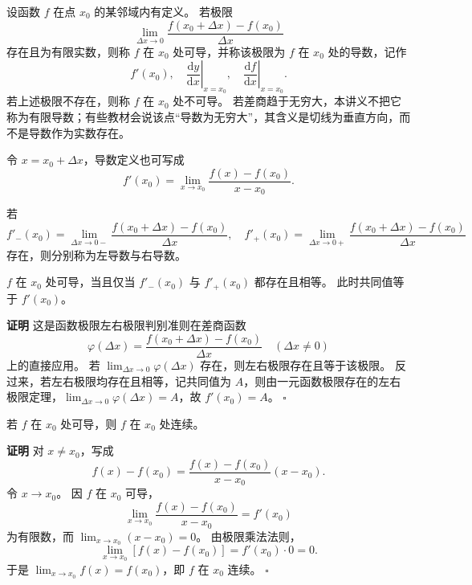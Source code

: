 \documentclass[fontset=fandol]{ctexart}
\newenvironment{proofdetail}{\par\noindent\textbf{证明}\quad}{\hfill$\square$\par\vspace{0.8em}}
\newcommand{\dd}{\mathrm{d}}
\begin{document}
\begin{definition}[导数]
设函数 $f$ 在点 $x_0$ 的某邻域内有定义。 若极限
\[
\lim_{\Delta x\to0}\frac{f(x_0+\Delta x)-f(x_0)}{\Delta x}
\]
存在且为有限实数，则称 $f$ 在 $x_0$ 处可导，并称该极限为 $f$ 在 $x_0$ 处的导数，记作
\[
f'(x_0),\quad \left.\frac{\dd y}{\dd x}\right|_{x=x_0},\quad \left.\frac{\dd f}{\dd x}\right|_{x=x_0}.
\]
若上述极限不存在，则称 $f$ 在 $x_0$ 处不可导。 若差商趋于无穷大，本讲义不把它称为有限导数；有些教材会说该点“导数为无穷大”，其含义是切线为垂直方向，而不是导数作为实数存在。
\end{definition}

令 $x=x_0+\Delta x$，导数定义也可写成
\[
f'(x_0)=\lim_{x\to x_0}\frac{f(x)-f(x_0)}{x-x_0}.
\]

\begin{definition}[左导数与右导数]
若
\[
f'_-(x_0)=\lim_{\Delta x\to0-}\frac{f(x_0+\Delta x)-f(x_0)}{\Delta x},\quad
f'_+(x_0)=\lim_{\Delta x\to0+}\frac{f(x_0+\Delta x)-f(x_0)}{\Delta x}
\]
存在，则分别称为左导数与右导数。
\end{definition}

\begin{proposition}[可导的充要条件]
$f$ 在 $x_0$ 处可导，当且仅当 $f'_-(x_0)$ 与 $f'_+(x_0)$ 都存在且相等。 此时共同值等于 $f'(x_0)$。
\end{proposition}
\begin{proofdetail}
这是函数极限左右极限判别准则在差商函数
\[
\varphi(\Delta x)=\frac{f(x_0+\Delta x)-f(x_0)}{\Delta x}\quad(\Delta x\neq0)
\]
上的直接应用。 若 $\lim_{\Delta x\to0}\varphi(\Delta x)$ 存在，则左右极限存在且等于该极限。 反过来，若左右极限均存在且相等，记共同值为 $A$，则由一元函数极限存在的左右极限定理，$\lim_{\Delta x\to0}\varphi(\Delta x)=A$，故 $f'(x_0)=A$。
\end{proofdetail}

\begin{theorem}[可导必连续]
若 $f$ 在 $x_0$ 处可导，则 $f$ 在 $x_0$ 处连续。
\end{theorem}
\begin{proofdetail}
对 $x\neq x_0$，写成
\[
f(x)-f(x_0)=\frac{f(x)-f(x_0)}{x-x_0}(x-x_0).
\]
令 $x\to x_0$。 因 $f$ 在 $x_0$ 可导，
\[
\lim_{x\to x_0}\frac{f(x)-f(x_0)}{x-x_0}=f'(x_0)
\]
为有限数，而 $\lim_{x\to x_0}(x-x_0)=0$。 由极限乘法法则，
\[
\lim_{x\to x_0}[f(x)-f(x_0)]=f'(x_0)\cdot0=0.
\]
于是 $\lim_{x\to x_0}f(x)=f(x_0)$，即 $f$ 在 $x_0$ 连续。
\end{proofdetail}
\end{document}
